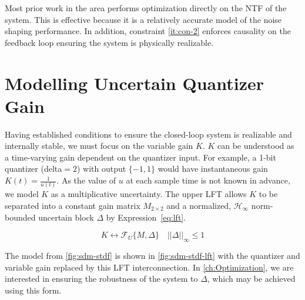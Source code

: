 Most prior work in the area performs optimization directly on the \gls{NTF} of the system. This is effective because it is a relatively accurate model of the noise shaping performance. In addition, constraint \ref{it:con-2} enforces causality on the feedback loop ensuring the system is physically realizable.

\section{Modelling Uncertain Quantizer Gain}

Having established conditions to ensure the closed-loop system is realizable and internally stable, we must focus on the variable gain $K$. $K$ can be understood as a time-varying gain dependent on the quantizer input. For example, a 1-bit quantizer (\gls{delta}$ = 2$) with output $\{-1, 1\}$ would have instantaneous gain $K(t) = \frac{1}{u(t)}$. As the value of $u$ at each sample time is not known in advance, we model $K$ as a multiplicative uncertainty. The upper \gls{LFT} allows $K$ to be separated into a constant gain matrix $M_{2 \times 2}$ and a normalized, $\mathcal{H}_\infty$ norm-bounded uncertain block $\Delta$ by Expression~\ref{eq:lft}.

\begin{equation}
	K \leftrightarrow \mathcal{F}_U\{M, \Delta\} \quad ||\Delta||_\infty \leq 1 \label{eq:lft}
\end{equation}

The model from \autoref{fig:sdm-stdf} is shown in \autoref{fig:sdm-stdf-lft} with the quantizer and variable gain replaced by this \gls{LFT} interconnection. In \autoref{ch:Optimization}, we are interested in ensuring the robustness of the system to $\Delta$, which may be achieved using this form.

